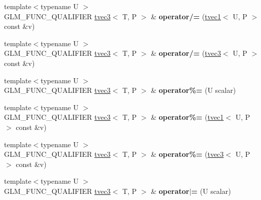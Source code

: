 \begin{DoxyCompactItemize}
{\footnotesize template$<$typename U $>$ }\\G\+L\+M\+\_\+\+F\+U\+N\+C\+\_\+\+Q\+U\+A\+L\+I\+F\+I\+ER \hyperlink{structglm_1_1tvec3}{tvec3}$<$ T, P $>$ \& {\bfseries operator/=} (\hyperlink{structglm_1_1tvec1}{tvec1}$<$ U, P $>$ const \&v)
\item 
\mbox{\label{structglm_1_1tvec3_ad71db80da3ef78d0ac88533c9177ea77}} 
{\footnotesize template$<$typename U $>$ }\\G\+L\+M\+\_\+\+F\+U\+N\+C\+\_\+\+Q\+U\+A\+L\+I\+F\+I\+ER \hyperlink{structglm_1_1tvec3}{tvec3}$<$ T, P $>$ \& {\bfseries operator/=} (\hyperlink{structglm_1_1tvec3}{tvec3}$<$ U, P $>$ const \&v)
\item 
\mbox{\label{structglm_1_1tvec3_acfb20e1b76ecfdd8487ab0f9d1a9420f}} 
{\footnotesize template$<$typename U $>$ }\\G\+L\+M\+\_\+\+F\+U\+N\+C\+\_\+\+Q\+U\+A\+L\+I\+F\+I\+ER \hyperlink{structglm_1_1tvec3}{tvec3}$<$ T, P $>$ \& {\bfseries operator\%=} (U scalar)
\item 
\mbox{\label{structglm_1_1tvec3_aea61db59d6e74810ebdd814c44d0c7d2}} 
{\footnotesize template$<$typename U $>$ }\\G\+L\+M\+\_\+\+F\+U\+N\+C\+\_\+\+Q\+U\+A\+L\+I\+F\+I\+ER \hyperlink{structglm_1_1tvec3}{tvec3}$<$ T, P $>$ \& {\bfseries operator\%=} (\hyperlink{structglm_1_1tvec1}{tvec1}$<$ U, P $>$ const \&v)
\item 
\mbox{\label{structglm_1_1tvec3_a4a0e1e225a1525d06c194dec0e966b67}} 
{\footnotesize template$<$typename U $>$ }\\G\+L\+M\+\_\+\+F\+U\+N\+C\+\_\+\+Q\+U\+A\+L\+I\+F\+I\+ER \hyperlink{structglm_1_1tvec3}{tvec3}$<$ T, P $>$ \& {\bfseries operator\%=} (\hyperlink{structglm_1_1tvec3}{tvec3}$<$ U, P $>$ const \&v)
\item 
\mbox{\label{structglm_1_1tvec3_a9360cf3807e8083c69a12ffc6151a981}} 
{\footnotesize template$<$typename U $>$ }\\G\+L\+M\+\_\+\+F\+U\+N\+C\+\_\+\+Q\+U\+A\+L\+I\+F\+I\+ER \hyperlink{structglm_1_1tvec3}{tvec3}$<$ T, P $>$ \& {\bfseries operator$\vert$=} (U scalar)
\item 
\mbox{\label{structglm_1_1tvec3_a36f603bc6496f2bc32b3e3001ba38e57}} 

\end{DoxyCompactItemize}
